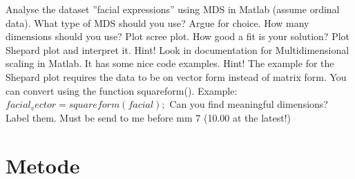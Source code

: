 Analyse the dataset ”facial expressions” using MDS in Matlab (assume ordinal data).
What type of MDS should you use? Argue for choice. How many dimensions should you use? Plot scree plot.
How good a fit is your solution? Plot Shepard plot and interpret it.
Hint! Look in documentation for Multidimensional scaling in Matlab. It has some nice code examples.
Hint! The example for the Shepard plot requires the data to
be on vector form instead of matrix form. You can convert
using the function squareform(). Example: $facial_vector=squareform(facial);$
Can you find meaningful dimensions? Label them. Must be send to me before mm 7 (10.00 at the latest!)

\section*{Metode}
\label{Metode}
%


